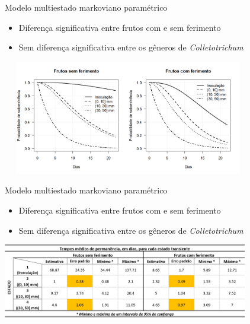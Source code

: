 \begin{frame}

\begin{block}{Modelo multiestado markoviano paramétrico}
 \begin{itemize}
  \item Diferença significativa entre frutos com e sem ferimento
  \item Sem diferença significativa entre os gêneros de
        \textit{Colletotrichum}
 \end{itemize}
\end{block}

\vspace{-.7cm}

\pause

\begin{center}
 \includegraphics*[height = 5cm, width = 11cm]{ic_msm.png}
\end{center}

\end{frame}

\begin{frame}

\begin{block}{Modelo multiestado markoviano paramétrico}
 \begin{itemize}
  \item Diferença significativa entre frutos com e sem ferimento
  \item Sem diferença significativa entre os gêneros de
        \textit{Colletotrichum}
 \end{itemize}
\end{block}

\begin{center}
 \includegraphics*[width = 10.75cm]{ic-table_msm.png}
\end{center}

\end{frame}


